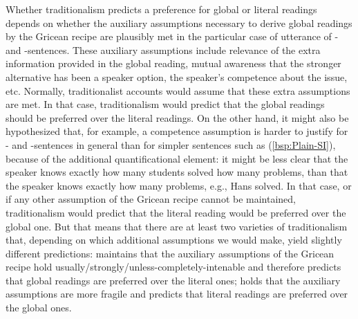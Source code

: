\documentclass[fleqn,reqno,10pt,draft]{article}
\newcommand{\as}{\acro{as}}
\renewcommand{\es}{\acro{es}}
\begin{document}
Whether traditionalism predicts a preference for global or literal
readings depends on whether the auxiliary assumptions necessary to
derive global readings by the Gricean recipe are plausibly met in the
particular case of utterance of \as- and \es-sentences. These
auxiliary assumptions include relevance of the extra information
provided in the global reading, mutual awareness that the stronger
alternative has been a speaker option, the speaker's competence about
the issue, etc. Normally, traditionalist accounts would assume that
these extra assumptions are met. In that case, traditionalism would
predict that the global readings should be preferred over the literal
readings. On the other hand, it might also be hypothesized that, for
example, a competence assumption is harder to justify for \as- and
\es-sentences in general than for simpler sentences such as
(\ref{bsp:Plain-SI}), because of the additional quantificational
element: it might be less clear that the speaker knows exactly how
many students solved how many problems, than that the speaker knows
exactly how many problems, e.g., Hans solved. In that case, or if any
other assumption of the Gricean recipe cannot be maintained,
traditionalism would predict that the literal reading would be
preferred over the global one. But that means that there are at least
two varieties of traditionalism that, depending on which additional
assumptions we would make, yield slightly different predictions:
 maintains that the
auxiliary assumptions of the Gricean recipe hold
usually/strongly/unless-completely-intenable and therefore predicts
that global readings are preferred over the literal ones;  holds that the auxiliary assumptions
are more fragile and predicts that literal readings are preferred over
the global ones.
\end{document}
